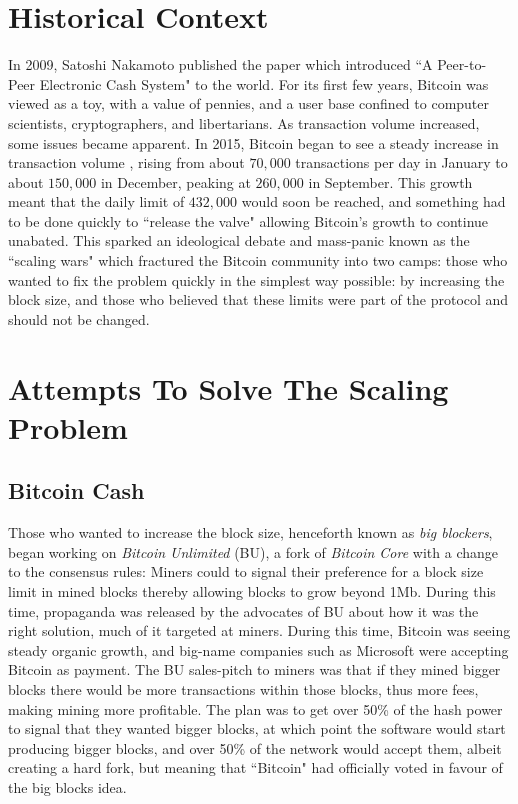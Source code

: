 \documentclass{report}
\begin{document}
	\section{Historical Context}
	In 2009, Satoshi Nakamoto  published the paper which introduced ``A Peer-to-Peer Electronic Cash System" \cite{bitcoin} to the world. For its first few years, Bitcoin was viewed as a toy, with a value of pennies, and a user base confined to computer scientists, cryptographers, and libertarians. As transaction volume increased, some issues became apparent. In 2015, Bitcoin began to see a steady increase in transaction volume \cite{txvolume}, rising from about $70,000$ transactions per day in January to about $150,000$ in December, peaking at $260,000$ in September. This growth meant that the daily limit of $432,000$ would soon be reached, and something had to be done quickly to ``release the valve" allowing Bitcoin's growth to continue unabated. This sparked an ideological debate and mass-panic known as the ``scaling wars"  which fractured the Bitcoin community into two camps: those who wanted to fix the problem quickly in the simplest way possible: by increasing the block size, and those who believed that these limits were part of the protocol and should not be changed. \\
		
		\section{Attempts To Solve The Scaling Problem}
		
		\subsection{Bitcoin Cash}
		
		Those who wanted to increase the block size, henceforth known as \textit{big blockers},  began working on \textit{Bitcoin Unlimited} (BU), \cite{bu}  a fork of \textit{Bitcoin Core} \cite{bc}  with a change to the consensus rules: Miners could to signal their preference for a block size limit  in mined  blocks thereby allowing blocks to grow beyond 1Mb. During this time, propaganda  was released by the advocates of BU about how it was the right solution, much of it targeted at miners. During this time, Bitcoin was seeing steady organic growth, and big-name companies such as Microsoft  were accepting Bitcoin as payment. \cite{mspayments} The BU sales-pitch to miners was that if they mined bigger blocks  there would be more transactions within those blocks, thus more fees, making mining more profitable. The plan was to get over 50\% of the hash power  to signal that they wanted bigger blocks, at which point the software would start producing bigger blocks, and over 50\% of the network would accept them, albeit creating a hard fork,  but meaning that ``Bitcoin" had officially voted  in favour of the big blocks idea. \\
		
\end{document}

